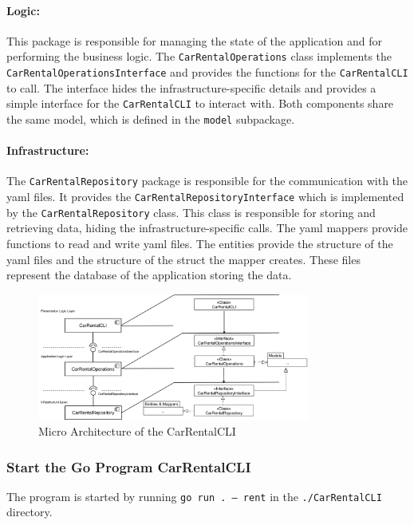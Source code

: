 \paragraph*{Logic:}
This package is responsible for managing the state of the application and for performing the business logic.
The \texttt{CarRentalOperations} class implements the \texttt{CarRentalOperationsInterface} and provides the functions for the \texttt{CarRentalCLI} to call.
The interface hides the infrastructure-specific details and provides a simple interface for the \texttt{CarRentalCLI} to interact with.
Both components share the same model, which is defined in the \texttt{model} subpackage.

\paragraph*{Infrastructure:}
The \texttt{CarRentalRepository} package is responsible for the communication with the yaml files.
It provides the \texttt{CarRentalRepositoryInterface} which is implemented by the \texttt{CarRentalRepository} class.
This class is responsible for storing and retrieving data, hiding the infrastructure-specific calls.
The yaml mappers provide functions to read and write yaml files.
The entities provide the structure of the yaml files and the structure of the struct the mapper creates.
These files represent the database of the application storing the data.

\begin{figure}[h]
      \centering
      \includegraphics[width=0.8\textwidth]{figures/goLang/carRental/carRentalCLI/carRentalCLI_MicroArchitecture.png}
      \caption{Micro Architecture of the CarRentalCLI}
      \label{fig:car_rental_cli_micro_architecture}
\end{figure}

\subsubsection*{Start the Go Program CarRentalCLI}
The program is started by running \texttt{go run . --- rent} in the \texttt{./CarRentalCLI} directory.

